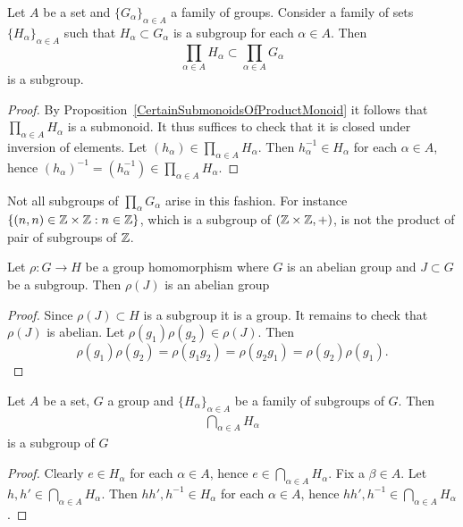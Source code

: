\begin{proposition}\label{CertainSubgroupsOfProductGroup}
    Let $A$ be a set and $\{G_\alpha\}_{\alpha\in A}$ a family of groups. Consider a family of sets $\{H_\alpha\}_{\alpha\in A}$ such that $H_\alpha\subset G_\alpha$ is a subgroup for each $\alpha\in A$. Then $$\prod_{\alpha\in A} H_\alpha \subset \prod_{\alpha \in A} G_\alpha$$
    is a subgroup.
\end{proposition}
\begin{proof}
    By Proposition~\ref{CertainSubmonoidsOfProductMonoid} it follows that $\prod_{\alpha\in A} H_\alpha$ is a submonoid. It thus suffices to check that it is closed under inversion of elements. Let $(h_\alpha)\in\prod_{\alpha\in A} H_\alpha$. Then $h_\alpha^{-1}\in H_\alpha$ for each $\alpha \in A$, hence $(h_\alpha)^{-1} = \left( h_\alpha^{-1} \right)\in \prod_{\alpha\in A} H_\alpha$.
\end{proof}
\begin{example}
    Not all subgroups of $\prod_\alpha G_\alpha$ arise in this fashion. For instance $\{(n,n)\in \mathbb{Z}\times \mathbb{Z} : n\in \mathbb{Z}\}$, which is a subgroup of $(\mathbb{Z}\times \mathbb{Z},+)$, is not the product of pair of subgroups of $\mathbb{Z}$.
\end{example}
\begin{lemma}
    Let $\rho : G\rightarrow H$ be a group homomorphism where $G$ is an abelian group and $J\subset G$ be a subgroup. Then $\rho(J)$ is an abelian group
\end{lemma}
\begin{proof}
    Since $\rho(J)\subset H$ is a subgroup it is a group. It remains to check that $\rho(J)$ is abelian. Let $\rho(g_1)\rho(g_2)\in \rho(J)$. Then 
    $$\rho(g_1)\rho(g_2)= \rho(g_1g_2)= \rho(g_2g_1) = \rho(g_2)\rho(g_1).$$
\end{proof}
\begin{proposition}\label{IntersectionsOfSubgroupIsSubgroup}
    Let $A$ be a set, $G$ a group and $\{H_\alpha\}_{\alpha\in A}$ be a family of subgroups of $G$. Then 
    \begin{gather*}
        \bigcap_{\alpha\in A} H_\alpha 
    \end{gather*}
    is a subgroup of $G$
\end{proposition}
\begin{proof}
    Clearly $e\in H_\alpha$ for each $\alpha\in A$, hence $e\in \bigcap_{\alpha\in A} H_\alpha$. Fix a $\beta\in A$. Let $h,h'\in \bigcap_{\alpha\in A} H_\alpha$. Then $hh',h^{-1}\in H_\alpha$ for each $\alpha \in A$, hence $hh',h^{-1}\in \bigcap_{\alpha\in A} H_\alpha$.
\end{proof}
